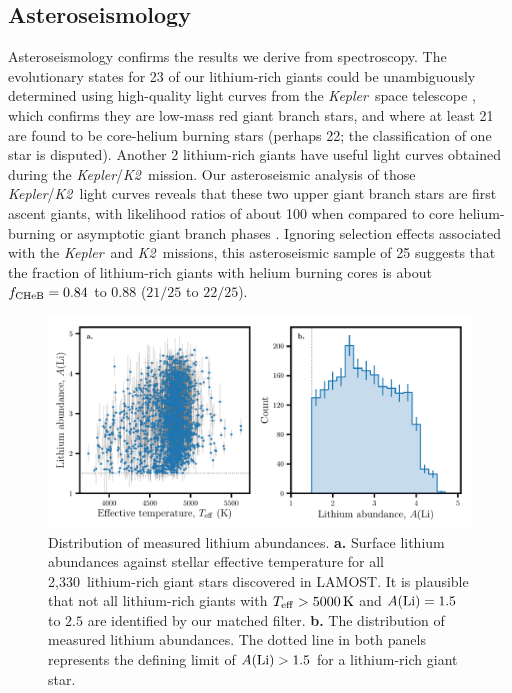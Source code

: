 \documentclass[twocolumn]{aastex62}
\newcommand{\SampleSize}{2,330}
\newcommand\lamost{LAMOST}
\newcommand{\project}[1]{\emph{#1}}
\newcommand{\kepler}{\project{Kepler}}
\newcommand{\ktwo}{\project{K2}}
\begin{document}



\subsection{Asteroseismology}


Asteroseismology confirms the results we derive from spectroscopy. 
The evolutionary states for 23 of our lithium-rich giants could be unambiguously determined
using high-quality light 
curves from the \kepler\ space telescope \citep[Figure~\ref{fig:figure1}c;][]{Mosser_2012,Stello_2013,Vrard_2016}, 
which confirms they are low-mass red giant branch stars, and where at 
least 21 are found to be core-helium burning stars (perhaps 22; the classification of one star is disputed).
Another 2 lithium-rich giants have useful light curves obtained during the \kepler/\ktwo\ mission. 
Our asteroseismic analysis of those \kepler/\ktwo\ light curves reveals that these two upper giant 
branch stars are first ascent giants, with likelihood ratios of about 100 when compared to core
helium-burning or asymptotic giant branch phases \citep{Hekker_2017}. Ignoring selection effects associated with the \kepler\ and \ktwo\ missions, this asteroseismic sample of 25 suggests that the fraction of lithium-rich giants with helium burning cores is about $f_{\rm CHeB} = 0.84$ to $0.88$ ($21/25$ to $22/25$).
 

\begin{figure}[t]
    \includegraphics[width=\textwidth]{ref_li_distribution}
	\caption{Distribution of measured lithium abundances. \textbf{a.} Surface lithium abundances against stellar effective temperature for all \SampleSize\ lithium-rich giant stars discovered in \lamost. It is plausible that not all lithium-rich giants with $T_{\rm eff} > 5000\,{\rm K}$ and $A({\rm Li}) = 1.5$ to $2.5$ are identified by our matched filter. \textbf{b.} The distribution of measured lithium abundances.  The dotted line in both panels represents the defining limit of $A({\rm Li}) > 1.5$ for a lithium-rich giant star.}
    \label{fig:li_distribution}
\end{figure} 
\end{document}
